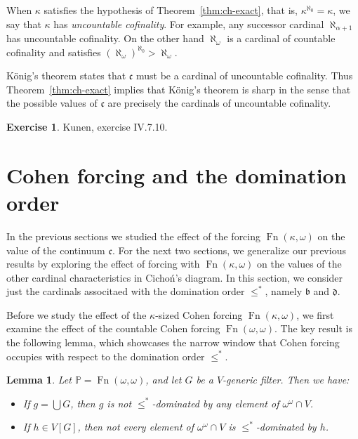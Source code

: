\documentclass[11pt,oneside]{amsbook}
\newcommand{\PP}{\mathbb P}
\DeclareMathOperator{\Fn}{Fn}
\theoremstyle{definition}
\newtheorem{exercise}{Exercise}[section]
\theoremstyle{plain}
\newtheorem{lemma}[theorem]{Lemma}
\theoremstyle{definition}
\theoremstyle{remark}
\numberwithin{equation}{section}
\numberwithin{figure}{section}
\begin{document}
When $\kappa$ satisfies the hypothesis of Theorem~\ref{thm:ch-exact}, that is, $\kappa^{\aleph_0}=\kappa$, we say that $\kappa$ has \emph{uncountable cofinality}. For example, any successor cardinal $\aleph_{\alpha+1}$ has uncountable cofinality. On the other hand $\aleph_\omega$ is a cardinal of countable cofinality and satisfies $(\aleph_\omega)^{\aleph_0}>\aleph_\omega$.
  
K\"onig's theorem states that $\mathfrak c$ must be a cardinal of uncountable cofinality. Thus Theorem~\ref{thm:ch-exact} implies that K\"onig's theorem is sharp in the sense that the possible values of $\mathfrak c$ are precisely the cardinals of uncountable cofinality.

\begin{exercise}
  Kunen, exercise IV.7.10.
\end{exercise}


\newpage
\section{Cohen forcing and the domination order}

In the previous sections we studied the effect of the forcing $\Fn(\kappa,\omega)$ on the value of the continuum $\mathfrak c$. For the next two sections, we generalize our previous results by exploring the effect of forcing with $\Fn(\kappa,\omega)$ on the values of the other cardinal characteristics in Cicho\'n's diagram. In this section, we consider just the cardinals associtaed with the domination order $\leq^*$, namely $\mathfrak b$ and $\mathfrak d$.

Before we study the effect of the $\kappa$-sized Cohen forcing $\Fn(\kappa,\omega)$, we first examine the effect of the countable Cohen forcing $\Fn(\omega,\omega)$. The key result is the following lemma, which showcases the narrow window that Cohen forcing occupies with respect to the domination order $\leq^*$.

\begin{lemma}
  \label{lem:cohen-dominating}
  Let $\PP=\Fn(\omega,\omega)$, and let $G$ be a $V$-generic filter. Then we have:
  \begin{itemize}
  \item If $g=\bigcup G$, then $g$ is not $\leq^*$-dominated by any element of $\omega^\omega\cap V$.
  \item If $h\in V[G]$, then not every element of $\omega^\omega\cap V$ is $\leq^*$-dominated by $h$.
  \end{itemize}
\end{lemma}
\end{document}
